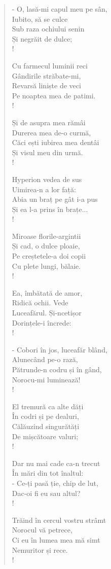 \documentclass{article}
\begin{document}
\begin{small}
\begin{multicols}{3}
\begin{verse}
- O, lasă-mi capul meu pe sân, \\
Iubito, să se culce \\
Sub raza ochiului senin \\
Și negrăit de dulce; \\!

Cu farmecul luminii reci \\
Gândirile străbate-mi, \\
Revarsă liniște de veci \\
Pe noaptea mea de patimi. \\!

Și de asupra mea rămâi \\
Durerea mea de-o curmă, \\
Căci ești iubirea mea dentâi \\
Și visul meu din urmă. \\!

Hyperion vedea de sus \\
Uimirea-n a lor față: \\
Abia un braț pe gât i-a pus \\
Și ea l-a prins în brațe... \\!

Miroase florile-argintii \\
Și cad, o dulce ploaie, \\
Pe creștetele-a doi copii \\
Cu plete lungi, bălaie. \\!

Ea, îmbătată de amor, \\
Ridică ochii. Vede \\
Luceafărul. Și-ncetișor \\
Dorințele-i încrede: \\!

- Cobori în jos, luceafăr blând, \\
Alunecând pe-o rază, \\
Pătrunde-n codru și în gând, \\
Norocu-mi luminează! \\!

El tremură ca alte dăți \\
În codri și pe dealuri, \\
Călăuzind singurătăți \\
De mișcătoare valuri; \\!

Dar nu mai cade ca-n trecut \\
În mări din tot înaltul: \\
- Ce-ți pasă ție, chip de lut, \\
Dac-oi fi eu sau altul? \\!

Trăind în cercul vostru strâmt \\
Norocul vă petrece, \\
Ci eu în lumea mea mă simt \\
Nemuritor și rece. \\!
\end{verse}
\end{multicols}
\end{small}
\fi
\end{document}
